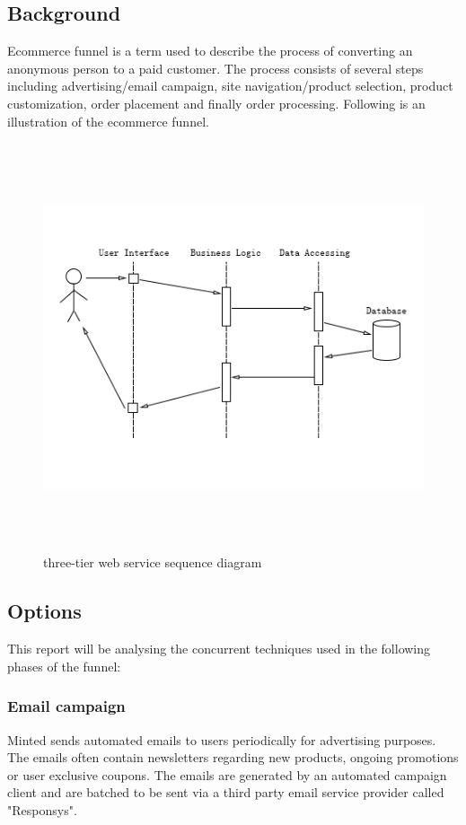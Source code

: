 \documentclass[12pt]{article}
\begin{document}
\subsection{Background}
Ecommerce funnel is a term used to describe the process of converting an anonymous person to a paid customer. The process consists of several steps including advertising/email campaign, site navigation/product selection, product customization, order placement and finally order processing. Following is an illustration of the ecommerce funnel.\\
\begin{figure}[ht!]
\centering
\includegraphics[width=12cm,height=12cm,keepaspectratio]{img/three_tier.jpg}
\caption{three-tier web service sequence diagram}
\label{overflow}
\end{figure}


\subsection{Options}
This report will be analysing the concurrent techniques used in the following phases of the funnel:
\subsubsection{Email campaign}
Minted sends automated emails to users periodically for advertising purposes. The emails often contain newsletters regarding new products, ongoing promotions or user exclusive coupons. The emails are generated by an automated campaign client and are batched to be sent via a third party email service provider called "Responsys".\\
		
\end{document}
